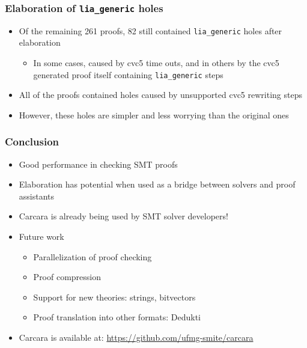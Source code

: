 \documentclass[usepdftitle=false,aspectratio=169]{beamer}
\newcommand\vitem{\vfill\item}
\begin{document}
\begin{frame}
  \frametitle{Elaboration of \texttt{lia\_generic} holes}
  \begin{itemize}
    \item Of the remaining 261 proofs, 82 still contained \texttt{lia\_generic}
      holes after elaboration
    \begin{itemize}
      \item In some cases, caused by cvc5 time outs, and in others by the cvc5
        generated proof itself containing \texttt{lia\_generic} steps
    \end{itemize}
    \vitem All of the proofs contained holes caused by unsupported cvc5 rewriting steps
    \vitem However, these holes are simpler and less worrying than the original
    ones
  \end{itemize}
\end{frame}

\begin{frame}
  \frametitle{Conclusion}

  \begin{itemize}
    \item Good performance in checking SMT proofs
    \vitem Elaboration has potential when used as a bridge between solvers and
    proof assistants
    \vitem Carcara is already being used by SMT solver developers!
    \vitem Future work
    \begin{itemize}
      \item Parallelization of proof checking
      \item Proof compression
      \item Support for new theories: strings, bitvectors
      \item Proof translation into other formats: Dedukti
    \end{itemize}
    \vitem Carcara is available at: \url{https://github.com/ufmg-smite/carcara}
  \end{itemize}
\end{frame}

\maketitle
\end{document}
